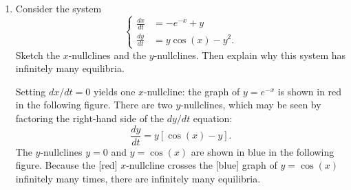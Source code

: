 \documentclass[main]{subfiles}
\begin{document}
\begin{enumerate}

      
   \item \label{introduce-nullclines}

     \begin{problem}
      Consider the system
      $$
        \left\{
        \begin{aligned}
        \frac{dx}{dt} & = -e^{-x} + y \\
        \frac{dy}{dt} & = y \cos(x) - y^{2}.
        \end{aligned}
        \right.
      $$
      Sketch the $x$-nullclines and the $y$-nullclines.  Then explain why
        this system has infinitely many equilibria.
      \end{problem}

      \begin{solution}
        Setting $dx/dt = 0$ yields one $x$-nullcline:  the graph of $y = e^{-x}$
        is shown in red in the following figure.  There are two $y$-nullclines,
        which may be seen by factoring the right-hand side of the $dy/dt$ equation:
        $$
        \frac{dy}{dt} = y \left[ \cos(x) - y \right].
        $$
        The $y$-nullclines $y = 0$ and $y = \cos(x)$ are shown in blue in the
        following figure.  Because the [red] $x$-nullcline crosses the [blue]
        graph of $y = \cos(x)$ infinitely many times, there are infinitely
        many equilibria.
        \begin{center}
\end{center}
      \end{solution}
      
    



    
\end{enumerate}
\end{document}

